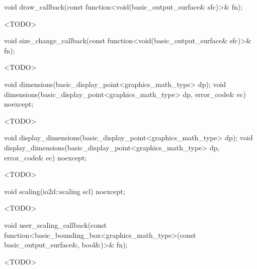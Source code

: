 %
\begin{itemdecl}
void draw_callback(const function<void(basic_output_surface& sfc)>& fn);
\end{itemdecl}
\begin{itemdescr}
\pnum
\effects
<TODO>
\end{itemdescr}

%
\begin{itemdecl}
void size_change_callback(const function<void(basic_output_surface& sfc)>& fn);
\end{itemdecl}
\begin{itemdescr}
\pnum
\effects
<TODO>
\end{itemdescr}

%
\begin{itemdecl}
void dimensions(basic_display_point<graphics_math_type> dp);
void dimensions(basic_display_point<graphics_math_type> dp, error_code& ec) noexcept;
\end{itemdecl}
\begin{itemdescr}
\pnum
\effects
<TODO>
\end{itemdescr}

%
\begin{itemdecl}
void display_dimensions(basic_display_point<graphics_math_type> dp);
void display_dimensions(basic_display_point<graphics_math_type> dp, error_code& ec) noexcept;
\end{itemdecl}
\begin{itemdescr}
\pnum
\effects
<TODO>
\end{itemdescr}

%
\begin{itemdecl}
void scaling(io2d::scaling scl) noexcept;
\end{itemdecl}
\begin{itemdescr}
\pnum
\effects
<TODO>
\end{itemdescr}

%
\begin{itemdecl}
void user_scaling_callback(const
  function<basic_bounding_box<graphics_math_type>(const basic_output_surface&, bool&)>& fn);
\end{itemdecl}
\begin{itemdescr}
\pnum
\effects
<TODO>
\end{itemdescr}

